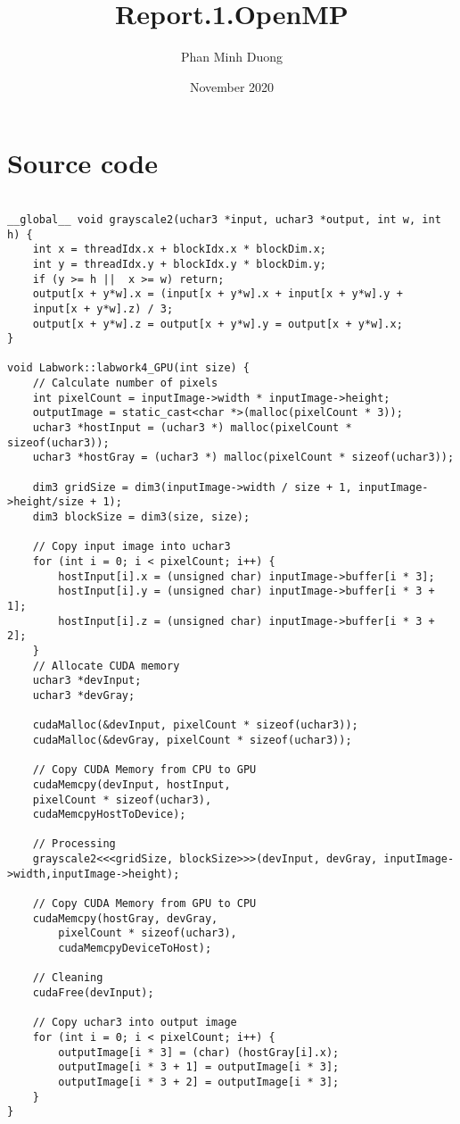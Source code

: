 \documentclass{article}
\title{Report.1.OpenMP}
\author{Phan Minh Duong}
\date{November 2020}
\begin{document}
\maketitle

\section{Source code}
\begin{verbatim}

__global__ void grayscale2(uchar3 *input, uchar3 *output, int w, int h) {
    int x = threadIdx.x + blockIdx.x * blockDim.x;
    int y = threadIdx.y + blockIdx.y * blockDim.y;
    if (y >= h ||  x >= w) return;
    output[x + y*w].x = (input[x + y*w].x + input[x + y*w].y +
    input[x + y*w].z) / 3;
    output[x + y*w].z = output[x + y*w].y = output[x + y*w].x;
}

void Labwork::labwork4_GPU(int size) {
    // Calculate number of pixels
    int pixelCount = inputImage->width * inputImage->height;
    outputImage = static_cast<char *>(malloc(pixelCount * 3));
    uchar3 *hostInput = (uchar3 *) malloc(pixelCount * sizeof(uchar3));
    uchar3 *hostGray = (uchar3 *) malloc(pixelCount * sizeof(uchar3));
    
    dim3 gridSize = dim3(inputImage->width / size + 1, inputImage->height/size + 1);
    dim3 blockSize = dim3(size, size);

    // Copy input image into uchar3
    for (int i = 0; i < pixelCount; i++) {
        hostInput[i].x = (unsigned char) inputImage->buffer[i * 3];
        hostInput[i].y = (unsigned char) inputImage->buffer[i * 3 + 1];
        hostInput[i].z = (unsigned char) inputImage->buffer[i * 3 + 2];
    }
    // Allocate CUDA memory  
    uchar3 *devInput;
    uchar3 *devGray;

    cudaMalloc(&devInput, pixelCount * sizeof(uchar3));
    cudaMalloc(&devGray, pixelCount * sizeof(uchar3));

    // Copy CUDA Memory from CPU to GPU
    cudaMemcpy(devInput, hostInput,
    pixelCount * sizeof(uchar3),
    cudaMemcpyHostToDevice);

    // Processing
    grayscale2<<<gridSize, blockSize>>>(devInput, devGray, inputImage->width,inputImage->height);

    // Copy CUDA Memory from GPU to CPU
    cudaMemcpy(hostGray, devGray,
        pixelCount * sizeof(uchar3),
        cudaMemcpyDeviceToHost);

    // Cleaning
    cudaFree(devInput);

    // Copy uchar3 into output image
    for (int i = 0; i < pixelCount; i++) {
        outputImage[i * 3] = (char) (hostGray[i].x);
        outputImage[i * 3 + 1] = outputImage[i * 3];
        outputImage[i * 3 + 2] = outputImage[i * 3];
    }
}

\end{verbatim}
\end{document}
